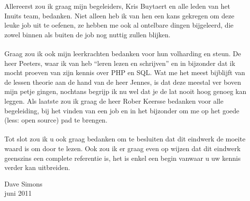 %
%
%
%
Allereerst zou ik graag mijn begeleiders, Kris Buytaert en alle leden van het Inuits team, bedanken. Niet alleen heb ik van hen een kans gekregen om deze leuke job uit te oefenen, ze hebben me ook al ontelbare dingen bijgeleerd, die zowel binnen als buiten de job nog nuttig zullen blijken.\\\\
Graag zou ik ook mijn leerkrachten bedanken voor hun volharding en steun. De heer Peeters, waar ik van heb ``leren lezen en schrijven'' en in bijzonder dat ik mocht proeven van zijn kennis over PHP en SQL. Wat me het meest bijblijft van de lessen theorie aan de hand van de heer Jennes, is dat deze meestal ver boven mijn petje gingen, nochtans begrijp ik nu wel dat je de lat nooit hoog genoeg kan leggen. Als laatste zou ik graag de heer Rober Keersse bedanken voor alle begeleiding, bij het vinden van een job en in het bijzonder om me op het goede (less: open source) pad te brengen.\\\\
Tot slot zou ik u ook graag bedanken om te besluiten dat dit eindwerk de moeite waard is om door te lezen. Ook zou ik er graag even op wijzen dat dit eindwerk geenszins een complete referentie is, het is enkel een begin vanwaar u uw kennis verder kan uitbreiden. 

\begin{flushright}Dave Simons\\juni 2011\end{flushright}
